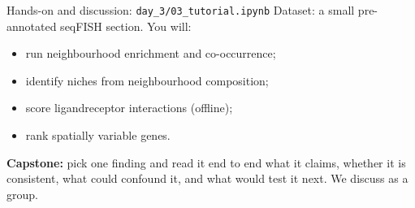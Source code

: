 \documentclass[aspectratio=169]{beamer}
\begin{document}
\begin{frame}{Hands-on and discussion: \texttt{day\_3/03\_tutorial.ipynb}}
  Dataset: a small pre-annotated seqFISH section. You will:
  \begin{itemize}
    \item run neighbourhood enrichment and co-occurrence;
    \item identify niches from neighbourhood composition;
    \item score ligand\textendash receptor interactions (offline);
    \item rank spatially variable genes.
  \end{itemize}
  \textbf{Capstone:} pick one finding and read it end to end \textendash{} what it
  claims, whether it is consistent, what could confound it, and what would test it
  next. We discuss as a group.
\end{frame}
\end{document}
